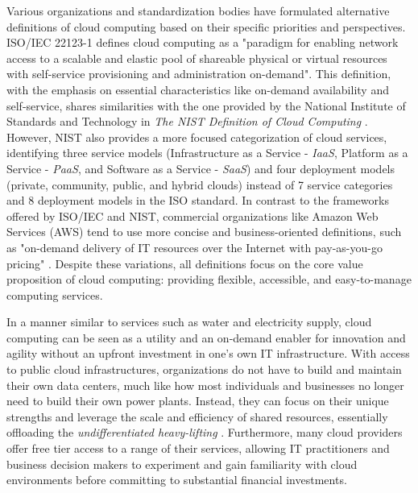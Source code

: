 Various organizations and standardization bodies have formulated alternative definitions of cloud computing based on their specific priorities and perspectives. ISO/IEC 22123-1 \cite{ISOIEC22123-1} defines cloud computing as a "paradigm for enabling network access to a scalable and elastic pool of shareable physical or virtual resources with self-service provisioning and administration on-demand". This definition, with the emphasis on essential characteristics like on-demand availability and self-service, shares similarities with the one provided by the National Institute of Standards and Technology in \emph{The NIST Definition of Cloud Computing} \cite{mell2011nist-definition}. However, NIST also provides a more focused categorization of cloud services, identifying three service models (Infrastructure as a Service - \emph{IaaS}, Platform as a Service - \emph{PaaS}, and Software as a Service - \emph{SaaS}) and four deployment models (private, community, public, and hybrid clouds) instead of 7 service categories and 8 deployment models in the ISO standard. In contrast to the frameworks offered by ISO/IEC and NIST, commercial organizations like Amazon Web Services (AWS) tend to use more concise and business-oriented definitions, such as "on-demand delivery of IT resources over the Internet with pay-as-you-go pricing" \cite{aws-what-is-cloud}. Despite these variations, all definitions focus on the core value proposition of cloud computing: providing flexible, accessible, and easy-to-manage computing services.




In a manner similar to services such as water and electricity supply, cloud computing can be seen as a utility and an on-demand enabler for innovation and agility without an upfront investment \cite{grossman2009case-for-cloud-computing} in one's own IT infrastructure. With access to public cloud infrastructures, organizations do not have to build and maintain their own data centers, much like how most individuals and businesses no longer need to build their own power plants. Instead, they can focus on their unique strengths and leverage the scale and efficiency of shared resources, essentially offloading the \emph{undifferentiated heavy-lifting} \cite{kingsley2023cloud-applications}. Furthermore, many cloud providers offer free tier access to a range of their services, allowing IT practitioners and business decision makers to experiment and gain familiarity with cloud environments before committing to substantial financial investments.

